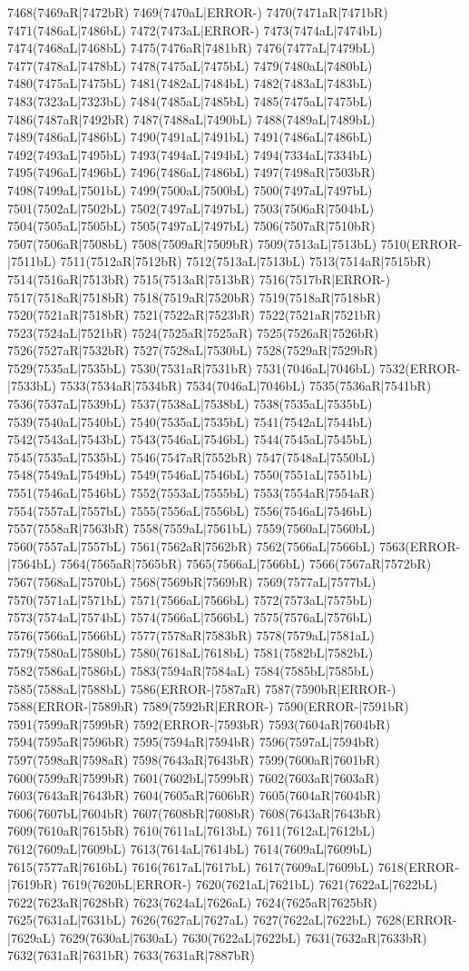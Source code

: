 7468(7469aR|7472bR) 7469(7470aL|ERROR-) 7470(7471aR|7471bR) 7471(7486aL|7486bL) 7472(7473aL|ERROR-) 7473(7474aL|7474bL) 7474(7468aL|7468bL) 7475(7476aR|7481bR) 7476(7477aL|7479bL) 7477(7478aL|7478bL) 7478(7475aL|7475bL) 7479(7480aL|7480bL) 7480(7475aL|7475bL) 7481(7482aL|7484bL) 7482(7483aL|7483bL) 7483(7323aL|7323bL) 7484(7485aL|7485bL) 7485(7475aL|7475bL) 7486(7487aR|7492bR) 7487(7488aL|7490bL) 7488(7489aL|7489bL) 7489(7486aL|7486bL) 7490(7491aL|7491bL) 7491(7486aL|7486bL) 7492(7493aL|7495bL) 7493(7494aL|7494bL) 7494(7334aL|7334bL) 7495(7496aL|7496bL) 7496(7486aL|7486bL) 7497(7498aR|7503bR) 7498(7499aL|7501bL) 7499(7500aL|7500bL) 7500(7497aL|7497bL) 7501(7502aL|7502bL) 7502(7497aL|7497bL) 7503(7506aR|7504bL) 7504(7505aL|7505bL) 7505(7497aL|7497bL) 7506(7507aR|7510bR) 7507(7506aR|7508bL) 7508(7509aR|7509bR) 7509(7513aL|7513bL) 7510(ERROR-|7511bL) 7511(7512aR|7512bR) 7512(7513aL|7513bL) 7513(7514aR|7515bR) 7514(7516aR|7513bR) 7515(7513aR|7513bR) 7516(7517bR|ERROR-) 7517(7518aR|7518bR) 7518(7519aR|7520bR) 7519(7518aR|7518bR) 7520(7521aR|7518bR) 7521(7522aR|7523bR) 7522(7521aR|7521bR) 7523(7524aL|7521bR) 7524(7525aR|7525aR) 7525(7526aR|7526bR) 7526(7527aR|7532bR) 7527(7528aL|7530bL) 7528(7529aR|7529bR) 7529(7535aL|7535bL) 7530(7531aR|7531bR) 7531(7046aL|7046bL) 7532(ERROR-|7533bL) 7533(7534aR|7534bR) 7534(7046aL|7046bL) 7535(7536aR|7541bR) 7536(7537aL|7539bL) 7537(7538aL|7538bL) 7538(7535aL|7535bL) 7539(7540aL|7540bL) 7540(7535aL|7535bL) 7541(7542aL|7544bL) 7542(7543aL|7543bL) 7543(7546aL|7546bL) 7544(7545aL|7545bL) 7545(7535aL|7535bL) 7546(7547aR|7552bR) 7547(7548aL|7550bL) 7548(7549aL|7549bL) 7549(7546aL|7546bL) 7550(7551aL|7551bL) 7551(7546aL|7546bL) 7552(7553aL|7555bL) 7553(7554aR|7554aR) 7554(7557aL|7557bL) 7555(7556aL|7556bL) 7556(7546aL|7546bL) 7557(7558aR|7563bR) 7558(7559aL|7561bL) 7559(7560aL|7560bL) 7560(7557aL|7557bL) 7561(7562aR|7562bR) 7562(7566aL|7566bL) 7563(ERROR-|7564bL) 7564(7565aR|7565bR) 7565(7566aL|7566bL) 7566(7567aR|7572bR) 7567(7568aL|7570bL) 7568(7569bR|7569bR) 7569(7577aL|7577bL) 7570(7571aL|7571bL) 7571(7566aL|7566bL) 7572(7573aL|7575bL) 7573(7574aL|7574bL) 7574(7566aL|7566bL) 7575(7576aL|7576bL) 7576(7566aL|7566bL) 7577(7578aR|7583bR) 7578(7579aL|7581aL) 7579(7580aL|7580bL) 7580(7618aL|7618bL) 7581(7582bL|7582bL) 7582(7586aL|7586bL) 7583(7594aR|7584aL) 7584(7585bL|7585bL) 7585(7588aL|7588bL) 7586(ERROR-|7587aR) 7587(7590bR|ERROR-) 7588(ERROR-|7589bR) 7589(7592bR|ERROR-) 7590(ERROR-|7591bR) 7591(7599aR|7599bR) 7592(ERROR-|7593bR) 7593(7604aR|7604bR) 7594(7595aR|7596bR) 7595(7594aR|7594bR) 7596(7597aL|7594bR) 7597(7598aR|7598aR) 7598(7643aR|7643bR) 7599(7600aR|7601bR) 7600(7599aR|7599bR) 7601(7602bL|7599bR) 7602(7603aR|7603aR) 7603(7643aR|7643bR) 7604(7605aR|7606bR) 7605(7604aR|7604bR) 7606(7607bL|7604bR) 7607(7608bR|7608bR) 7608(7643aR|7643bR) 7609(7610aR|7615bR) 7610(7611aL|7613bL) 7611(7612aL|7612bL) 7612(7609aL|7609bL) 7613(7614aL|7614bL) 7614(7609aL|7609bL) 7615(7577aR|7616bL) 7616(7617aL|7617bL) 7617(7609aL|7609bL) 7618(ERROR-|7619bR) 7619(7620bL|ERROR-) 7620(7621aL|7621bL) 7621(7622aL|7622bL) 7622(7623aR|7628bR) 7623(7624aL|7626aL) 7624(7625aR|7625bR) 7625(7631aL|7631bL) 7626(7627aL|7627aL) 7627(7622aL|7622bL) 7628(ERROR-|7629aL) 7629(7630aL|7630aL) 7630(7622aL|7622bL) 7631(7632aR|7633bR) 7632(7631aR|7631bR) 7633(7631aR|7887bR) 